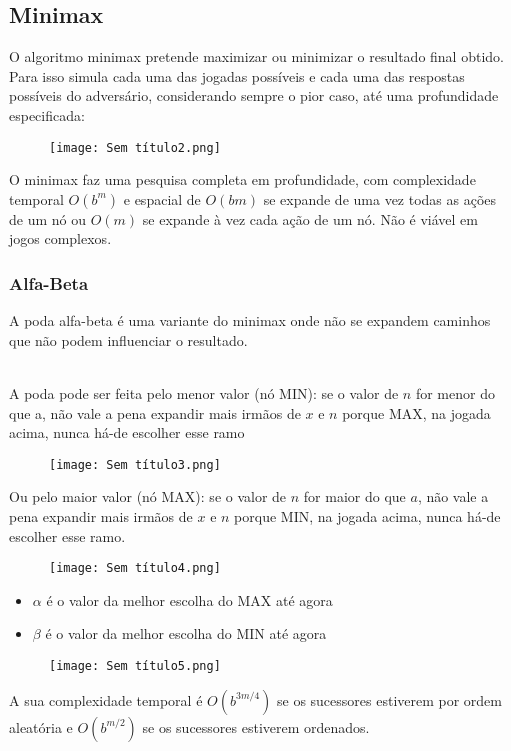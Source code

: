\documentclass[10pt,a4paper]{report}
\begin{document}
\subsection{Minimax}
O algoritmo minimax pretende maximizar ou minimizar o resultado final obtido. Para isso simula cada uma das jogadas possíveis e cada uma das respostas possíveis do adversário, considerando sempre o pior caso, até uma profundidade especificada:
\begin{figure}[H]
\centering
\texttt{[image: Sem título2.png]}
\end{figure}
O minimax faz uma pesquisa completa em profundidade, com complexidade temporal $O(b^m)$ e espacial de $O(bm)$ se expande de uma vez todas as ações de um nó ou $O(m)$ se expande à vez cada ação de um nó. Não é viável em jogos complexos.
\subsubsection{Alfa-Beta}
A poda alfa-beta é uma variante do minimax onde não se expandem caminhos que não podem influenciar o resultado.\\
\\
\begin{minipage}[c]{0.4\textwidth}
A poda pode ser feita pelo menor valor (nó MIN): se o valor de $n$ for menor do que a, não vale a pena expandir mais irmãos de $x$ e $n$ porque MAX, na jogada acima, nunca há-de escolher esse ramo
\end{minipage}\hfill
\begin{minipage}[c]{0.5\textwidth}
\begin{figure}[H]
\centering
\texttt{[image: Sem título3.png]}
\end{figure}
\end{minipage}
\begin{minipage}[c]{0.4\textwidth}
Ou pelo maior valor (nó MAX): se o valor de $n$ for maior do que $a$, não vale a pena expandir mais irmãos de $x$ e $n$ porque MIN, na jogada acima, nunca há-de escolher esse ramo.
\end{minipage}\hfill
\begin{minipage}[c]{0.5\textwidth}
\begin{figure}[H]
\centering
\texttt{[image: Sem título4.png]}
\end{figure}
\end{minipage}
\begin{itemize}
\item $\alpha$ é o valor da melhor escolha do MAX até agora
\item $\beta$ é o valor da melhor escolha do MIN até agora
\end{itemize}
\begin{figure}[H]
\centering
\texttt{[image: Sem título5.png]}
\end{figure}
A sua complexidade temporal é $O(b^{3m/4})$ se os sucessores estiverem por ordem aleatória e $O(b^{m/2})$ se os sucessores estiverem ordenados.
\end{document}
